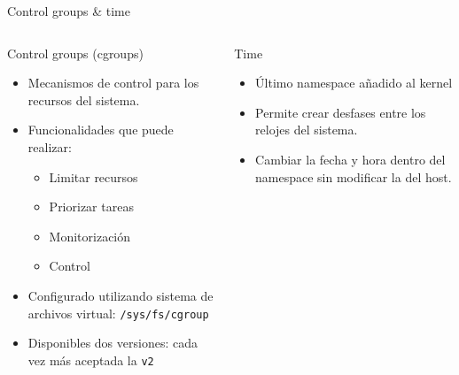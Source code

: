 \documentclass[aspectratio=169,xcolor=dvipsnames]{beamer}
\begin{document}
    \begin{frame}{Control groups \& time}
        \begin{columns}
            \begin{column}{0.5\textwidth}
                \begin{block}{\centering Control groups (cgroups)}
                    \begin{itemize}
                        \item Mecanismos de control para los recursos del sistema.
                        \item Funcionalidades que puede realizar:
                        \begin{itemize}
                            \item Limitar recursos
                            \item Priorizar tareas
                            \item Monitorización
                            \item Control
                        \end{itemize}
                        \item Configurado utilizando sistema de archivos virtual: \texttt{/sys/fs/cgroup}
                        \item Disponibles dos versiones: cada vez más aceptada la \texttt{v2}
                    \end{itemize}
                \end{block}
            \end{column}
        
            \begin{column}{0.5\textwidth}
                \begin{block}{\centering Time}
                    \begin{itemize}
                        \item Último namespace añadido al kernel
                        \item Permite crear desfases entre los relojes del sistema.
                        \item Cambiar la fecha y hora dentro del namespace sin modificar la del host.
                    \end{itemize}
                \end{block}
            \end{column}
        \end{columns}
    \end{frame}
	
\end{document}
